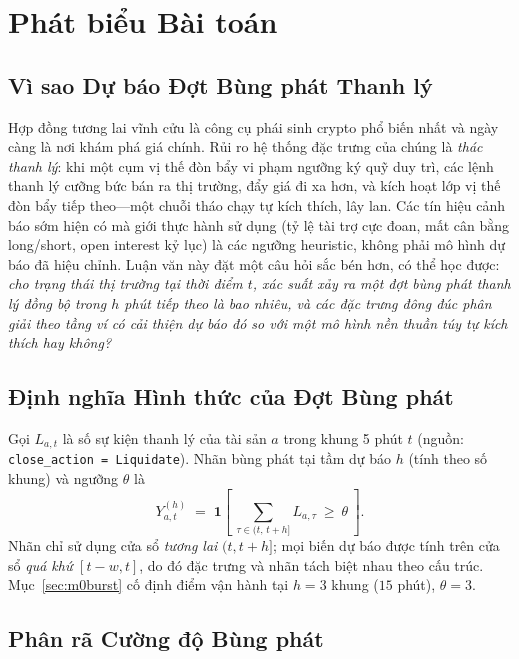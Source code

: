 \documentclass[11pt,a4paper]{article}
\begin{document}
\section{Phát biểu Bài toán}
\label{sec:formulation}

\subsection{Vì sao Dự báo Đợt Bùng phát Thanh lý}

Hợp đồng tương lai vĩnh cửu là công cụ phái sinh crypto phổ biến nhất và ngày càng là nơi khám phá giá chính. Rủi ro hệ thống đặc trưng của chúng là \emph{thác thanh lý}: khi một cụm vị thế đòn bẩy vi phạm ngưỡng ký quỹ duy trì, các lệnh thanh lý cưỡng bức bán ra thị trường, đẩy giá đi xa hơn, và kích hoạt lớp vị thế đòn bẩy tiếp theo---một chuỗi tháo chạy tự kích thích, lây lan. Các tín hiệu cảnh báo sớm hiện có mà giới thực hành sử dụng (tỷ lệ tài trợ cực đoan, mất cân bằng long/short, open interest kỷ lục) là các ngưỡng heuristic, không phải mô hình dự báo đã hiệu chỉnh. Luận văn này đặt một câu hỏi sắc bén hơn, có thể học được: \emph{cho trạng thái thị trường tại thời điểm $t$, xác suất xảy ra một đợt bùng phát thanh lý đồng bộ trong $h$ phút tiếp theo là bao nhiêu, và các đặc trưng đông đúc phân giải theo tầng ví có cải thiện dự báo đó so với một mô hình nền thuần túy tự kích thích hay không?}

\subsection{Định nghĩa Hình thức của Đợt Bùng phát}

Gọi $L_{a,t}$ là số sự kiện thanh lý của tài sản $a$ trong khung 5 phút $t$ (nguồn: \texttt{close\_action = Liquidate}). Nhãn bùng phát tại tầm dự báo $h$ (tính theo số khung) và ngưỡng $\theta$ là
\begin{equation}
Y^{(h)}_{a,t} \;=\; \mathbf{1}\!\left[\ \sum_{\tau \in (t,\,t+h]} L_{a,\tau}\ \ge\ \theta\ \right].
\label{eq:burst}
\end{equation}
Nhãn chỉ sử dụng cửa sổ \emph{tương lai} $(t, t+h]$; mọi biến dự báo được tính trên cửa sổ \emph{quá khứ} $[t-w, t]$, do đó đặc trưng và nhãn tách biệt nhau theo cấu trúc. Mục~\ref{sec:m0burst} cố định điểm vận hành tại $h=3$ khung ($15$ phút), $\theta=3$.

\subsection{Phân rã Cường độ Bùng phát}
\end{document}
